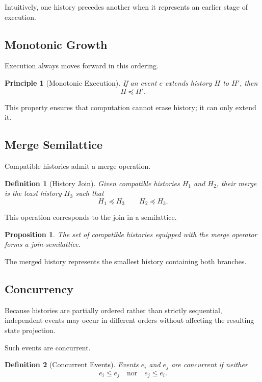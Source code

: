 \documentclass[12pt]{article}
\newtheorem{definition}{Definition}
\newtheorem{principle}{Principle}
\newtheorem{proposition}{Proposition}
\begin{document}
Intuitively, one history precedes another when it
represents an earlier stage of execution.

\subsection{Monotonic Growth}

Execution always moves forward in this ordering.

\begin{principle}[Monotonic Execution]
If an event $e$ extends history $H$ to $H'$,
then
\[
H \preceq H'.
\]
\end{principle}

This property ensures that computation cannot
erase history; it can only extend it.

\subsection{Merge Semilattice}

Compatible histories admit a merge operation.

\begin{definition}[History Join]
Given compatible histories $H_1$ and $H_2$,
their merge is the least history $H_3$ such that
\[
H_1 \preceq H_3
\qquad
H_2 \preceq H_3.
\]
\end{definition}

This operation corresponds to the join in a
semilattice.

\begin{proposition}
The set of compatible histories equipped with
the merge operator forms a join-semilattice.
\end{proposition}

The merged history represents the smallest
history containing both branches.

\subsection{Concurrency}

Because histories are partially ordered rather
than strictly sequential, independent events
may occur in different orders without affecting
the resulting state projection.

Such events are concurrent.

\begin{definition}[Concurrent Events]
Events $e_i$ and $e_j$ are concurrent if neither
\[
e_i \leq e_j
\quad \text{nor} \quad
e_j \leq e_i.
\]
\end{definition}
\end{document}
